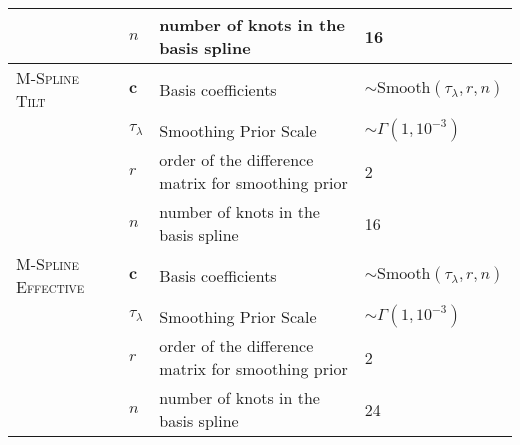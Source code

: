 \begin{table*}[ht!]
\begin{tabular}{|l|l|l|l|}
    & $n$ & number of knots in the basis spline & 16 \\ \hline
    \textsc{M-Spline Tilt} & $\bm{c}$ &  Basis coefficients & $\sim \mathrm{Smooth}(\tau_\lambda, r, n)$  \\ \cline{2-4} 
    & $\tau_\lambda$ & Smoothing Prior Scale & $\sim \Gamma(1, 10^{-3})$ \\ \cline{2-4}
    & $r$ & order of the difference matrix for smoothing prior & 2 \\ \cline{2-4} 
    & $n$ & number of knots in the basis spline & 16 \\ \hline
    \textsc{M-Spline Effective} & $\bm{c}$ &  Basis coefficients & $\sim \mathrm{Smooth}(\tau_\lambda, r, n)$  \\ \cline{2-4} 
    & $\tau_\lambda$ & Smoothing Prior Scale & $\sim \Gamma(1, 10^{-3})$ \\ \cline{2-4}
    & $r$ & order of the difference matrix for smoothing prior & 2 \\ \cline{2-4} 
    & $n$ & number of knots in the basis spline & 24 \\ \hline
    \end{tabular}
\end{table*} 




